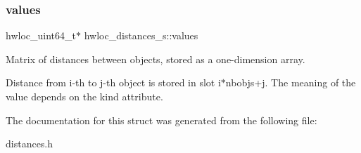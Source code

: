 \mbox{\label{a00310_ae43e19b2c743de05c93d71a30beaca75}} 
\subsubsection{\texorpdfstring{values}{values}}
{\footnotesize\ttfamily hwloc\+\_\+uint64\+\_\+t$\ast$ hwloc\+\_\+distances\+\_\+s\+::values}



Matrix of distances between objects, stored as a one-\/dimension array. 

Distance from i-\/th to j-\/th object is stored in slot i$\ast$nbobjs+j. The meaning of the value depends on the {\ttfamily kind} attribute. 

The documentation for this struct was generated from the following file\+:\begin{DoxyCompactItemize}
\item 
distances.\+h\end{DoxyCompactItemize}
